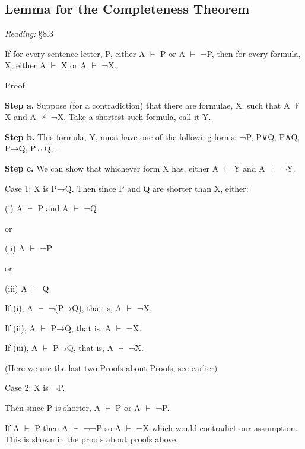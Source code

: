 \documentclass[12pt]{extarticle}
\begin{document}
\begin{multicols*}{3}
 
\section{Lemma for the Completeness Theorem}
 
\emph{Reading:} §8.3
 
 
If for every sentence letter, P, either A $\vdash$ P or A $\vdash$ ¬P, then for every formula, X, either A $\vdash$ X or A $\vdash$ ¬X.
 
Proof
 
\textbf{Step a.} Suppose (for a contradiction) that there are formulae, X, such that A $\nvdash$ X and A $\nvdash$ ¬X. Take a shortest such formula, call it Y.
 
\textbf{Step b.} This formula, Y, must have one of the following forms: ¬P, P∨Q, P∧Q, P→Q, P↔Q, $\bot$
 
\textbf{Step c.} We can show that whichever form X has, either A $\vdash$ Y and A $\vdash$ ¬Y.
 
Case 1: X is P→Q. Then since P and Q are shorter than X, either:
 
\hspace{5mm} (i) A $\vdash$ P and A $\vdash$ ¬Q
 
\hspace{5mm} or
 
\hspace{5mm} (ii) A $\vdash$ ¬P
 
\hspace{5mm} or
 
\hspace{5mm} (iii) A $\vdash$ Q
 
\hspace{5mm} If (i), A $\vdash$ ¬(P→Q), that is, A $\vdash$ ¬X.
 
\hspace{5mm} If (ii), A $\vdash$ P→Q, that is, A $\vdash$ ¬X.
 
\hspace{5mm} If (iii), A $\vdash$ P→Q, that is, A $\vdash$ ¬X.
 
\hspace{5mm} (Here we use the last two Proofs about Proofs, see earlier)
 
Case 2: X is ¬P.
 
\hspace{5mm} Then since P is shorter, A $\vdash$ P or A $\vdash$ ¬P.
 
\hspace{5mm} If A $\vdash$ P then A $\vdash$ ¬¬P so A $\vdash$ ¬X which would contradict our assumption. This is shown in the proofs about proofs above.
 

\end{multicols*}
\end{document}

